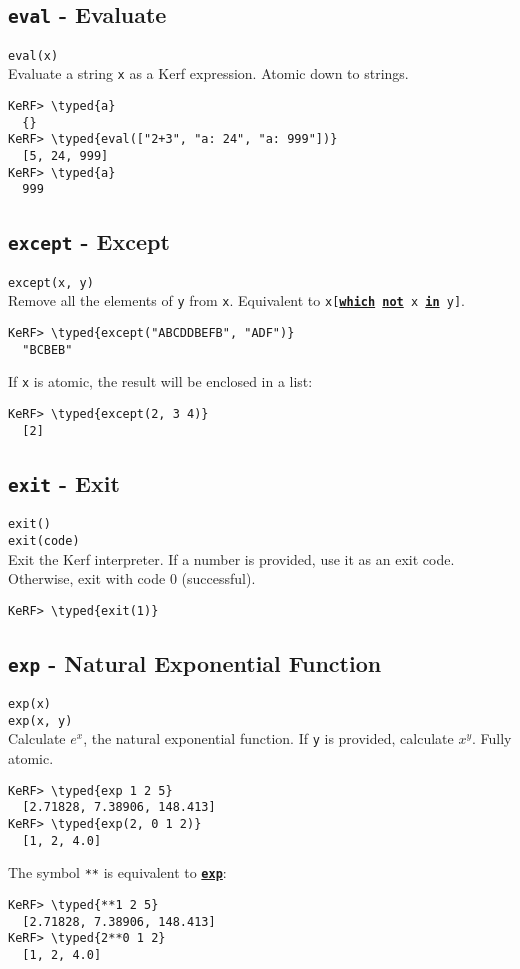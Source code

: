 \documentclass{article}
\newcommand{\typed}[1]{\textcolor{TealBlue}{#1}}
\newcommand{\primdefu}[3]{\subsection{\texttt{#1} - #2}\label{prim:#3}}
\newcommand{\primu}[2]{\hyperref[prim:#2]{\textbf{\texttt{#1}}}}
\newcommand{\primdef}[2]{\primdefu{#1}{#2}{#1}}
\newcommand{\prim}[1]{\primu{#1}{#1}}
\begin{document}
\primdef{eval}{Evaluate}
\texttt{eval(x)}\\

Evaluate a string \texttt{x} as a Kerf expression. Atomic down to strings.

\begin{Verbatim}
KeRF> \typed{a}
  {}
KeRF> \typed{eval(["2+3", "a: 24", "a: 999"])}
  [5, 24, 999]
KeRF> \typed{a}
  999
\end{Verbatim}

\primdef{except}{Except}
\texttt{except(x, y)}\\

Remove all the elements of \texttt{y} from \texttt{x}. Equivalent to \texttt{x[\prim{which} \prim{not} x \prim{in} y]}.
\begin{Verbatim}
KeRF> \typed{except("ABCDDBEFB", "ADF")}
  "BCBEB"
\end{Verbatim}

If \texttt{x} is atomic, the result will be enclosed in a list:
\begin{Verbatim}
KeRF> \typed{except(2, 3 4)}
  [2]
\end{Verbatim}

\primdef{exit}{Exit}
\texttt{exit()}\\
\texttt{exit(code)}\\

Exit the Kerf interpreter. If a number is provided, use it as an exit code.\\Otherwise, exit with code 0 (successful).

\begin{Verbatim}
KeRF> \typed{exit(1)}
\end{Verbatim}

\primdef{exp}{Natural Exponential Function}
\texttt{exp(x)}\\
\texttt{exp(x, y)}\\

Calculate $e^x$,  the natural exponential function. If \texttt{y} is provided, calculate $x^y$. Fully atomic.
\begin{Verbatim}
KeRF> \typed{exp 1 2 5}
  [2.71828, 7.38906, 148.413]
KeRF> \typed{exp(2, 0 1 2)}
  [1, 2, 4.0]
\end{Verbatim}

The symbol \texttt{**} is equivalent to \prim{exp}:
\begin{Verbatim}
KeRF> \typed{**1 2 5}
  [2.71828, 7.38906, 148.413]
KeRF> \typed{2**0 1 2}
  [1, 2, 4.0]
\end{Verbatim}
\end{document}
